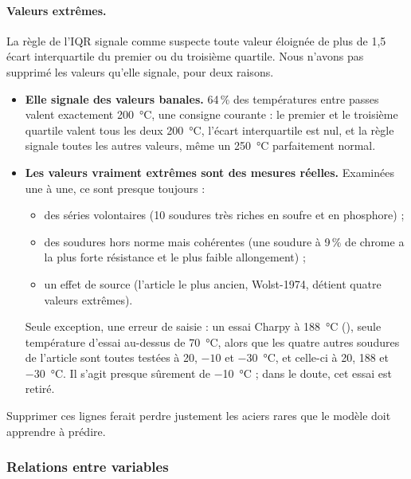 \paragraph{Valeurs extrêmes.} La règle de l'IQR signale comme suspecte toute valeur
éloignée de plus de 1,5 écart interquartile du premier ou du troisième quartile. Nous
n'avons pas supprimé les valeurs qu'elle signale, pour deux raisons.
\begin{itemize}
  \item \textbf{Elle signale des valeurs banales.} 64\,\% des températures entre passes
    valent exactement \SI{200}{\celsius}, une consigne courante : le premier et le
    troisième quartile valent tous les deux \SI{200}{\celsius}, l'écart interquartile est
    nul, et la règle signale toutes les autres valeurs, même un \SI{250}{\celsius}
    parfaitement normal.
  \item \textbf{Les valeurs vraiment extrêmes sont des mesures réelles.} Examinées une à
    une, ce sont presque toujours :
    \begin{itemize}
      \item des séries volontaires (10 soudures très riches en soufre et en phosphore) ;
      \item des soudures hors norme mais cohérentes (une soudure à 9\,\% de chrome a la
        plus forte résistance et le plus faible allongement) ;
      \item un effet de source (l'article le plus ancien, Wolst-1974, détient quatre
        valeurs extrêmes).
    \end{itemize}
    Seule exception, une erreur de saisie : un essai Charpy à \SI{188}{\celsius}
    (), seule température d'essai au-dessus de \SI{70}{\celsius},
    alors que les quatre autres soudures de l'article sont toutes testées à 20, $-10$ et
    \SI{-30}{\celsius}, et celle-ci à 20, 188 et \SI{-30}{\celsius}. Il s'agit presque
    sûrement de \SI{-10}{\celsius} ; dans le doute, cet essai est retiré.
\end{itemize}
Supprimer ces lignes ferait perdre justement les aciers rares que le modèle doit
apprendre à prédire.


\subsubsection{Relations entre variables}

